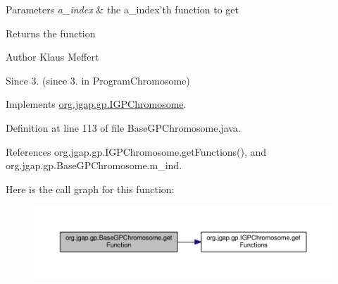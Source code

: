 \begin{DoxyParams}{Parameters}
{\em a\-\_\-index} & the a\-\_\-index'th function to get \\
\hline
\end{DoxyParams}
\begin{DoxyReturn}{Returns}
the function
\end{DoxyReturn}
\begin{DoxyAuthor}{Author}
Klaus Meffert 
\end{DoxyAuthor}
\begin{DoxySince}{Since}
3. (since 3. in Program\-Chromosome) 
\end{DoxySince}


Implements \hyperlink{interfaceorg_1_1jgap_1_1gp_1_1_i_g_p_chromosome_a76a7d9f2310e31bb9509bbd6ddc6c41d}{org.\-jgap.\-gp.\-I\-G\-P\-Chromosome}.



Definition at line 113 of file Base\-G\-P\-Chromosome.\-java.



References org.\-jgap.\-gp.\-I\-G\-P\-Chromosome.\-get\-Functions(), and org.\-jgap.\-gp.\-Base\-G\-P\-Chromosome.\-m\-\_\-ind.



Here is the call graph for this function\-:
\nopagebreak
\begin{figure}[H]
\begin{center}
\leavevmode
\includegraphics[width=350pt]{classorg_1_1jgap_1_1gp_1_1_base_g_p_chromosome_af1de58df592374bed5f5765988e37f6e_cgraph}
\end{center}
\end{figure}


